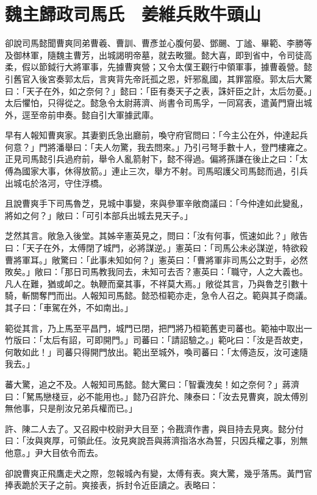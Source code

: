 
\chapter{魏主歸政司馬氏　姜維兵敗牛頭山}

卻說司馬懿聞曹爽同弟曹羲、曹訓、曹彥並心腹何晏、鄧颺、丁謐、畢範、李勝等及御林軍，隨魏主曹芳，出城謁明帝墓，就去畋獵。懿大喜，即到省中，令司徒高柔，假以節鉞行大將軍事，先據曹爽營；又令太僕王觀行中領軍事，據曹羲營。懿引舊官入後宮奏郭太后，言爽背先帝託孤之恩，奸邪亂國，其罪當廢。郭太后大驚曰：「天子在外，如之奈何？」懿曰：「臣有奏天子之表，誅奸臣之計，太后勿憂。」太后懼怕，只得從之。懿急令太尉蔣濟、尚書令司馬孚，一同寫表，遣黃門齎出城外，逕至帝前申奏。懿自引大軍據武庫。

早有人報知曹爽家。其妻劉氏急出廳前，喚守府官問曰：「今主公在外，仲達起兵何意？」門將潘舉曰：「夫人勿驚，我去問來。」乃引弓弩手數十人，登門樓雍之。正見司馬懿引兵過府前，舉令人亂箭射下，懿不得過。偏將孫謙在後止之曰：「太傅為國家大事，休得放箭。」連止三次，舉方不射。司馬昭護父司馬懿而過，引兵出城屯於洛河，守住浮橋。

且說曹爽手下司馬魯芝，見城中事變，來與參軍辛敞商議曰：「今仲達如此變亂，將如之何？」敞曰：「可引本部兵出城去見天子。」

芝然其言。敞急入後堂。其姊辛憲英見之，問曰：「汝有何事，慌速如此？」敞告曰：「天子在外，太傅閉了城門，必將謀逆。」憲英曰：「司馬公未必謀逆，特欲殺曹將軍耳。」敞驚曰：「此事未知如何？」憲英曰：「曹將軍非司馬公之對手，必然敗矣。」敞曰：「那日司馬教我同去，未知可去否？憲英曰：「職守，人之大義也。凡人在難，猶或卹之。執鞭而棄其事，不祥莫大焉。」敞從其言，乃與魯芝引數十騎，斬關奪門而出。人報知司馬懿。懿恐桓範亦走，急令人召之。範與其子商議。其子曰：「車駕在外，不如南出。」

範從其言，乃上馬至平昌門，城門已閉，把門將乃桓範舊吏司蕃也。範袖中取出一竹版曰：「太后有詔，可即開門。」司蕃曰：「請詔驗之。」範叱曰：「汝是吾故吏，何敢如此！」司蕃只得開門放出。範出至城外，喚司蕃曰：「太傅造反，汝可速隨我去。」

蕃大驚，追之不及。人報知司馬懿。懿大驚曰：「智囊洩矣！如之奈何？」蔣濟曰：「駑馬戀棧豆，必不能用也。」懿乃召許允、陳泰曰：「汝去見曹爽，說太傅別無他事，只是削汝兄弟兵權而已。」

許、陳二人去了。又召殿中校尉尹大目至；令戡濟作書，與目持去見爽。懿分付曰：「汝與爽厚，可領此任。汝見爽說吾與蔣濟指洛水為誓，只因兵權之事，別無他意。」尹大目依令而去。

卻說曹爽正飛鷹走犬之際，忽報城內有變，太傅有表。爽大驚，幾乎落馬。黃門官捧表跪於天子之前。爽接表，拆封令近臣讀之。表略曰：

